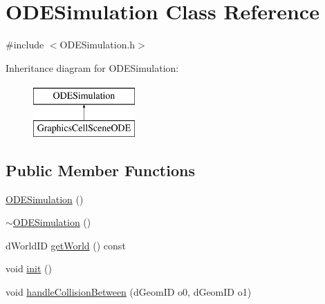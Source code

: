 \hypertarget{class_o_d_e_simulation}{\section{\-O\-D\-E\-Simulation \-Class \-Reference}
\label{class_o_d_e_simulation}
}


{\ttfamily \#include $<$\-O\-D\-E\-Simulation.\-h$>$}

\-Inheritance diagram for \-O\-D\-E\-Simulation\-:\begin{figure}[H]
\begin{center}
\leavevmode
\includegraphics[height=2.000000cm]{class_o_d_e_simulation}
\end{center}
\end{figure}
\subsection*{\-Public \-Member \-Functions}
\begin{DoxyCompactItemize}
\item 
\hyperlink{class_o_d_e_simulation_ae594151b85a5528b8c9cc44e268c7256}{\-O\-D\-E\-Simulation} ()
\item 
\hyperlink{class_o_d_e_simulation_abaa90d10deb102d150497ca5db7f1af4}{$\sim$\-O\-D\-E\-Simulation} ()
\item 
d\-World\-I\-D \hyperlink{class_o_d_e_simulation_a9320cdf91a7e002119eb0cb0bba9c7b0}{get\-World} () const 
\item 
void \hyperlink{class_o_d_e_simulation_a83fbf3e98bab325948da3e4d1b3f3848}{init} ()
\item 
void \hyperlink{class_o_d_e_simulation_a5a72dab563d6c80d6643c1f940bb3349}{handle\-Collision\-Between} (d\-Geom\-I\-D o0, d\-Geom\-I\-D o1)
\end{DoxyCompactItemize}
